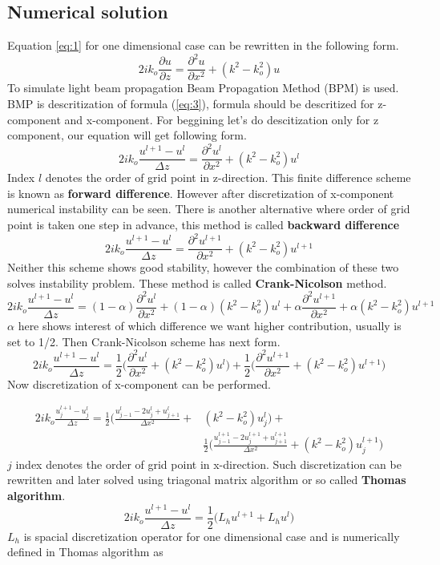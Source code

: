 \documentclass{article}
\begin{document}
	\subsection{Numerical solution}
	Equation \ref{eq:1} for one dimensional case can be rewritten in the following form.
	\begin{equation}\label{eq:3}
	2ik_o\frac{\partial u}{\partial z}=\frac{\partial^2 u}{\partial x^2}+(k^2-k_o^2)u
	\end{equation}
	To simulate light beam propagation Beam Propagation Method (BPM) is used. BMP is descritization of formula (\ref{eq:3}), formula should be descritized for z-component and x-component. For beggining let's do descitization only for z component, our equation will get following form.
	\[2ik_o\frac{u^{l+1}-u^l}{\Delta z}=\frac{\partial^2 u^l}{\partial x^2}+(k^2-k_o^2)u^l\]
	Index $l$ denotes the order of grid point in z-direction. This finite difference scheme is known as {\bf forward difference}. However after discretization of x-component numerical instability can be seen. There is another alternative where order of grid point is taken one step in advance, this method is called {\bf backward difference}
	\[2ik_o\frac{u^{l+1}-u^l}{\Delta z}=\frac{\partial^2 u^{l+1}}{\partial x^2}+(k^2-k_o^2)u^{l+1}\]
	Neither this scheme shows good stability, however the combination of these two solves instability problem. These method is called {\bf Crank-Nicolson} method.
	\[2ik_o\frac{u^{l+1}-u^l}{\Delta z}=(1-\alpha)\frac{\partial^2 u^l}{\partial x^2}+(1-\alpha)(k^2-k_o^2)u^l+\alpha \frac{\partial^2 u^{l+1}}{\partial x^2}+\alpha(k^2-k_o^2)u^{l+1}\]
	$\alpha$ here shows interest of which difference we want higher contribution, usually is set to 1/2. Then Crank-Nicolson scheme has next form.
	\[2ik_o\frac{u^{l+1}-u^l}{\Delta z}=\frac{1}{2}\bigg(\frac{\partial^2 u^l}{\partial x^2}+(k^2-k_o^2)u^l\bigg)+\frac{1}{2}\bigg(\frac{\partial^2 u^{l+1}}{\partial x^2}+(k^2-k_o^2)u^{l+1}\bigg)\]
	Now discretization of x-component can be performed.

	\begin{equation*}
	\begin{split}
	2ik_o\frac{u_j^{l+1}-u_j^l}{\Delta z}=\frac{1}{2}\bigg(\frac{u_{j-1}^l-2u_j^l+u_{j+1}^l}{\Delta x^2}+&(k^2-k_o^2)u_j^l\bigg)+\\
	& \frac{1}{2}\bigg(\frac{u_{j-1}^{l+1}-2u_j^{l+1}+u_{j+1}^{l+1}}{\Delta x^2}+(k^2-k_o^2)u_j^{l+1}\bigg)
	\end{split}
	\end{equation*}
	$j$ index denotes the order of grid point in x-direction. Such discretization can be rewritten and later solved using triagonal matrix algorithm or so called {\bf Thomas algorithm}. 
	\[2ik_o\frac{u^{l+1}-u^l}{\Delta z}=\frac{1}{2}\bigg(L_hu^{l+1}+L_hu^l\bigg)\]
	$L_h$ is spacial discretization operator for one dimensional case and is numerically defined in Thomas algorithm as 
\end{document}
